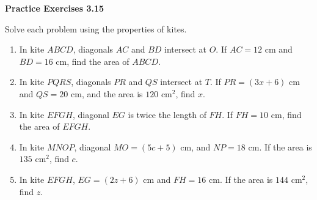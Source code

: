 \vspace{0.3ex}
\noindent\textbf{Practice Exercises 3.15}

\vspace{0.2ex}

Solve each problem using the properties of kites.

\begin{enumerate}[label=\color{blue}\arabic*.]
    \item In kite \(ABCD\), diagonals \(AC\) and \(BD\) intersect at \(O\). If \(AC = 12\) cm and \(BD = 16\) cm, find the area of \(ABCD\).
    \item In kite \(PQRS\), diagonals \(PR\) and \(QS\) intersect at \(T\). If \(PR = (3x + 6)\) cm and \(QS = 20\) cm, and the area is \(120\) cm\(^2\), find \(x\).
    \item In kite \(EFGH\), diagonal \(EG\) is twice the length of \(FH\). If \(FH = 10\) cm, find the area of \(EFGH\).
    \item In kite \(MNOP\), diagonal \(MO = (5c + 5)\) cm, and \(NP = 18\) cm. If the area is \(135\) cm\(^2\), find \(c\).
    \item In kite \(EFGH\), \(EG = (2z + 6)\) cm and \(FH = 16\) cm. If the area is \(144\) cm\(^2\), find \(z\).
\end{enumerate}
